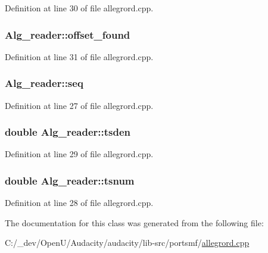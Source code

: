 Definition at line 30 of file allegrord.\+cpp.

\subsubsection[{\texorpdfstring{offset\+\_\+found}{offset_found}}]{ Alg\+\_\+reader\+::offset\+\_\+found}\hypertarget{class_alg__reader_a56a5a6f3c15d1d4dc34dfc7e2ebd4c97}{}\label{class_alg__reader_a56a5a6f3c15d1d4dc34dfc7e2ebd4c97}


Definition at line 31 of file allegrord.\+cpp.

\subsubsection[{\texorpdfstring{seq}{seq}}]{ Alg\+\_\+reader\+::seq}\hypertarget{class_alg__reader_a532be6b1a46e36017ac7c1206e53b61b}{}\label{class_alg__reader_a532be6b1a46e36017ac7c1206e53b61b}


Definition at line 27 of file allegrord.\+cpp.

\subsubsection[{\texorpdfstring{tsden}{tsden}}]{\setlength{\rightskip}{0pt plus 5cm}double Alg\+\_\+reader\+::tsden}\hypertarget{class_alg__reader_aa56620c910ea255efb7a8d500369bfa5}{}\label{class_alg__reader_aa56620c910ea255efb7a8d500369bfa5}


Definition at line 29 of file allegrord.\+cpp.

\subsubsection[{\texorpdfstring{tsnum}{tsnum}}]{\setlength{\rightskip}{0pt plus 5cm}double Alg\+\_\+reader\+::tsnum}\hypertarget{class_alg__reader_a7c8d0fb67e99004db331b113f6d911ec}{}\label{class_alg__reader_a7c8d0fb67e99004db331b113f6d911ec}


Definition at line 28 of file allegrord.\+cpp.



The documentation for this class was generated from the following file\+:\begin{DoxyCompactItemize}
\item 
C\+:/\+\_\+dev/\+Open\+U/\+Audacity/audacity/lib-\/src/portsmf/\hyperlink{allegrord_8cpp}{allegrord.\+cpp}\end{DoxyCompactItemize}
